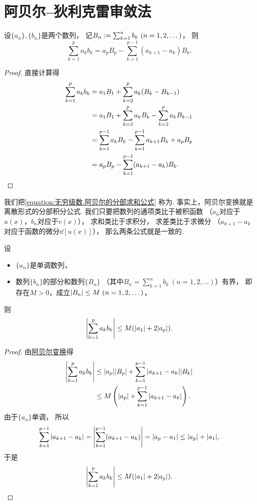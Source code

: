 \section{阿贝尔--狄利克雷审敛法}
\begin{lemma}[阿贝尔变换]
设\(\{a_n\},\{b_n\}\)是两个数列，
记\(B_n \defeq \sum_{k=1}^n b_k\ (n=1,2,\dotsc)\)，
则\begin{equation}\label{equation:无穷级数.阿贝尔的分部求和公式}
	\sum_{k=1}^p a_k b_k
	= a_p B_p - \sum_{k=1}^{p-1} (a_{k+1} - a_k) B_k.
\end{equation}
\begin{proof}
直接计算得\begin{align*}
	\sum_{k=1}^p a_k b_k
	&= a_1 B_1 + \sum_{k=2}^p a_k (B_k - B_{k-1}) \\
	&= a_1 B_1 + \sum_{k=2}^p a_k B_k - \sum_{k=2}^p a_k B_{k-1} \\
	&= \sum_{k=1}^{p-1} a_k B_k - \sum_{k=1}^{p-1} a_{k+1} B_k + a_p B_p \\
	&= a_p B_p - \sum_{k=1}^{p-1} (a_{k+1} - a_k) B_k.
	\qedhere
\end{align*}
\end{proof}
\end{lemma}
我们把\cref{equation:无穷级数.阿贝尔的分部求和公式} 称为.
事实上，阿贝尔变换就是离散形式的分部积分公式.
我们只要把数列的通项类比于被积函数
（\(a_n\)对应于\(u(x)\)，\(b_n\)对应于\(v(x)\)），
求和类比于求积分，
求差类比于求微分
（\(a_{k+1} - a_k\)对应于函数的微分\(\dd{[u(x)]}\)），
那么两条公式就是一致的.

\begin{lemma}[阿贝尔引理]\label{theorem:无穷级数.阿贝尔引理}
设\begin{itemize}
	\item \(\{a_n\}\)是单调数列，
	\item 数列\(\{b_n\}\)的部分和数列\(\{B_n\}\)
	（其中\(B_n = \sum_{k=1}^n b_k\ (n=1,2,\dotsc)\)）有界，
	即存在\(M>0\)，成立\(\abs{B_n} \leq M\ (n=1,2,\dotsc)\)，
\end{itemize}
则\[
	\abs{\sum_{k=1}^p a_k b_k}
	\leq M(\abs{a_1} + 2 \abs{a_p}).
\]
\begin{proof}
由\hyperref[equation:无穷级数.阿贝尔的分部求和公式]{阿贝尔变换}得\begin{align*}
	\abs{\sum_{k=1}^p a_k b_k}
	&\leq \abs{a_p} \abs{B_p} + \sum_{k=1}^{p-1} \abs{a_{k+1} - a_k} \abs{B_k} \\
	&\leq M \left(
		\abs{a_p}
		+ \sum_{k=1}^{p-1} \abs{a_{k+1} - a_k}
	\right).
\end{align*}
由于\(\{a_n\}\)单调，
所以\[
	\sum_{k=1}^{p-1} \abs{a_{k+1} - a_k}
	= \abs{\sum_{k=1}^{p-1} (a_{k+1} - a_k)}
	= \abs{a_p - a_1}
	\leq \abs{a_p} + \abs{a_1},
\]
于是\[
	\abs{\sum_{k=1}^p a_k b_k}
	\leq M(\abs{a_1} + 2 \abs{a_p}).
	\qedhere
\]
\end{proof}
\end{lemma}

